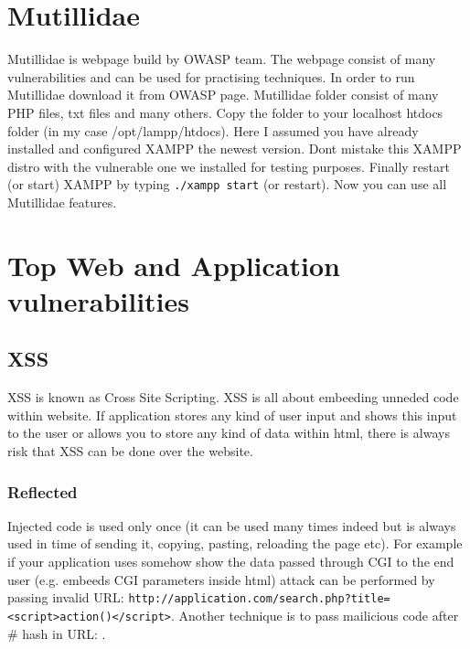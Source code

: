 \documentclass{article}[12pt]
\begin{document}




\section{Mutillidae} Mutillidae is webpage build by OWASP team.
The webpage consist of many vulnerabilities and can be used for practising techniques.
In order to run Mutillidae download it from OWASP page.
Mutillidae folder consist of many PHP files, txt files and many others.
Copy the folder to your localhost htdocs folder (in my case /opt/lampp/htdocs).
Here I assumed you have already installed and configured XAMPP the newest version.
Dont mistake this XAMPP distro with the vulnerable one we installed for testing purposes.
Finally restart (or start) XAMPP by typing \texttt{./xampp start} (or restart).
Now you can use all Mutillidae features.







\section{Top Web and Application vulnerabilities}




\subsection{XSS} XSS is known as Cross Site Scripting.
XSS is all about embeeding unneded code within website.
If application stores any kind of user input and shows this input to the user or allows you to store any kind of data within html, there is always risk that XSS can be done over the website.

\subsubsection{Reflected} Injected code is used only once (it can be used many times indeed but is always used in time of sending it, copying, pasting, reloading the page etc).
For example if your application uses somehow show the data passed through CGI to the end user (e.g. embeeds CGI parameters inside html) attack can be performed by passing invalid URL: \texttt{http://application.com/search.php?title=<script>action()</script>}.
Another technique is to pass mailicious code after \# hash in URL: \texttt{}.
\end{document}

